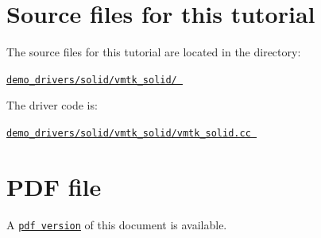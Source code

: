  

\hypertarget{index_sources}{}\section{Source files for this tutorial}\label{index_sources}

\begin{DoxyItemize}
\item The source files for this tutorial are located in the directory\+: \begin{center} \href{../../../../demo_drivers/solid/vmtk_solid/}{\tt demo\+\_\+drivers/solid/vmtk\+\_\+solid/ } \end{center} 
\item The driver code is\+: \begin{center} \href{../../../../demo_drivers/solid/vmtk_solid/vmtk_solid.cc}{\tt demo\+\_\+drivers/solid/vmtk\+\_\+solid/vmtk\+\_\+solid.\+cc } \end{center} 
\end{DoxyItemize}



 

 \hypertarget{index_pdf}{}\section{P\+D\+F file}\label{index_pdf}
A \href{../latex/refman.pdf}{\tt pdf version} of this document is available. 
